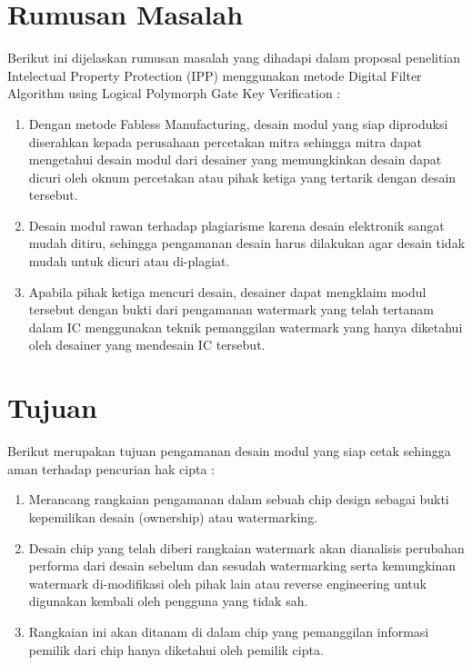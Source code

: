 \section{Rumusan Masalah}
Berikut ini dijelaskan rumusan masalah yang dihadapi dalam proposal
penelitian Intelectual Property Protection (IPP) menggunakan metode Digital
Filter Algorithm using Logical Polymorph Gate Key Verification :

\begin{enumerate}
	\item Dengan metode Fabless Manufacturing, desain modul yang siap
	diproduksi diserahkan kepada perusahaan percetakan mitra sehingga
	mitra dapat mengetahui desain modul dari desainer yang
	memungkinkan desain dapat dicuri oleh oknum percetakan atau pihak
	ketiga yang tertarik dengan desain tersebut.
	 
	\item Desain modul rawan terhadap plagiarisme karena desain elektronik
	sangat mudah ditiru, sehingga pengamanan desain harus dilakukan agar
	desain tidak mudah untuk dicuri atau di-plagiat.
	
	\item Apabila pihak ketiga mencuri desain, desainer dapat mengklaim modul
	tersebut dengan bukti dari pengamanan watermark yang telah tertanam
	dalam IC menggunakan teknik pemanggilan watermark yang hanya
	diketahui oleh desainer yang mendesain IC tersebut.
\end{enumerate}
\section{Tujuan}
Berikut merupakan tujuan pengamanan desain modul yang siap cetak
sehingga aman terhadap pencurian hak cipta :
\begin{enumerate}
	\item Merancang rangkaian pengamanan dalam sebuah chip design sebagai
	bukti kepemilikan desain (ownership) atau watermarking.
	
	\item Desain chip yang telah diberi rangkaian watermark akan dianalisis
	perubahan performa dari desain sebelum dan sesudah watermarking
	serta kemungkinan watermark di-modifikasi oleh pihak lain atau
	reverse engineering untuk digunakan kembali oleh pengguna yang tidak
	sah.
	
	\item Rangkaian ini akan ditanam di dalam chip yang pemanggilan informasi
	pemilik dari chip hanya diketahui oleh pemilik cipta.
\end{enumerate}
